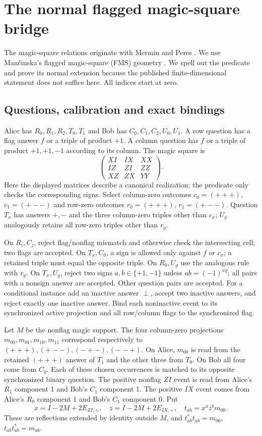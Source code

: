 \section{The normal flagged magic-square bridge}\label{sec:bridge}
The magic-square relations originate with Mermin and Peres \cite{Mermin,Peres}. We use Man\v{c}inska's flagged magic-square (FMS) geometry \cite{Mancinska}. We spell out the predicate and prove its normal extension because the published finite-dimensional statement does not suffice here. All indices start at zero.

\subsection{Questions, calibration and exact bindings}
Alice has $R_0,R_1,R_2,T_0,T_1$ and Bob has $C_0,C_1,C_2,U_0,U_1$. A row question has a flag answer $f$ or a triple of product $+1$. A column question has $f$ or a triple of product $+1,+1,-1$ according to its column. The magic square is
\begin{equation}\label{eq:square}
\begin{pmatrix}XI&IX&XX\\ IZ&ZI&ZZ\\ XZ&ZX&YY\end{pmatrix}.
\end{equation}
Here the displayed matrices describe a canonical realization; the predicate only checks the corresponding signs. Select column-zero outcomes $c_0=(+++)$, $c_1=(+--)$ and row-zero outcomes $r_0=(+++)$, $r_1=(+--)$. Question $T_x$ has answers $+,-$ and the three column-zero triples other than $c_x$; $U_y$ analogously retains all row-zero triples other than $r_y$.

On $R_i,C_j$, reject flag/nonflag mismatch and otherwise check the intersecting cell; two flags are accepted. On $T_x,C_0$, a sign is allowed only against $f$ or $c_x$; a retained triple must equal the opposite triple. On $R_0,U_y$ use the analogous rule with $r_y$. On $T_x,U_y$, reject two signs $a,b\in\{+1,-1\}$ unless $ab=(-1)^{xy}$; all pairs with a nonsign answer are accepted. Other question pairs are accepted. For a conditional instance add an inactive answer $\perp$, accept two inactive answers, and reject exactly one inactive answer. Bind each noninactive event to its synchronized active projection and all row/column flags to the synchronized flag.

Let $M$ be the nonflag magic support. The four column-zero projections $m_{00},m_{01},m_{10},m_{11}$ correspond respectively to $(+++),(+--),(-+-),(--+)$. On Alice, $m_{00}$ is read from the retained $(+++)$ answer of $T_1$ and the other three from $T_0$. On Bob all four come from $C_0$. Each of these chosen occurrences is matched to its opposite synchronized binary question. The positive nonflag $ZI$ event is read from Alice's $R_1$ component 1 and Bob's $C_1$ component 1. The positive $IX$ event comes from Alice's $R_0$ component 1 and Bob's $C_1$ component 0. Put
\[
 x=I-2M+2E_{ZI,+},\quad z=I-2M+2E_{IX,+},\quad
 t_{ab}=x^az^bm_{00}.
\]
These are reflections extended by identity outside $M$, and $t_{ab}^*t_{ab}=m_{00}$, $t_{ab}t_{ab}^*=m_{ab}$.

